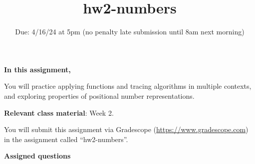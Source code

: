 \title{hw2-numbers}
\date{Due: 4/16/24 at 5pm (no penalty late submission until 8am next morning)}

\maketitle
\thispagestyle{fancy}


{\bf In this assignment,}

You will practice applying functions and tracing algorithms in multiple contexts, 
and exploring properties of positional number representations.

{\bf Relevant class material}: Week 2.

You will submit this assignment via Gradescope
(\href{https://www.gradescope.com}{https://www.gradescope.com}) 
in the assignment called ``hw2-numbers''.

\instructions

{\bf Assigned questions}

